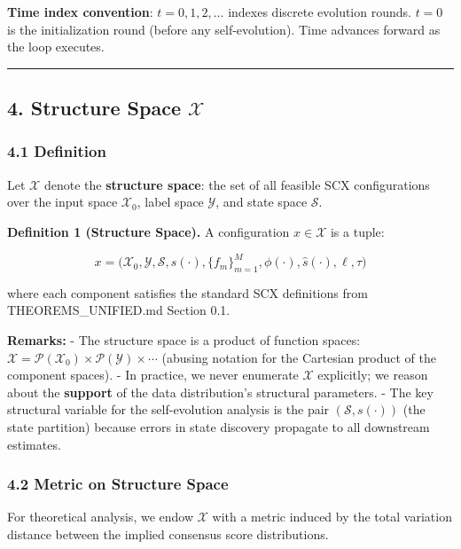 \documentclass[
  12pt,
]{article}
\begin{document}
\textbf{Time index convention}: \(t = 0, 1, 2, \dots\) indexes discrete
evolution rounds. \(t=0\) is the initialization round (before any
self-evolution). Time advances forward as the loop executes.

\begin{center}\rule{0.5\linewidth}{0.5pt}\end{center}

\subsection{\texorpdfstring{4. Structure Space
\(\mathcal{X}\)}{4. Structure Space \textbackslash mathcal\{X\}}}\label{structure-space-mathcalx}

\subsubsection{4.1 Definition}\label{definition}

Let \(\mathcal{X}\) denote the \textbf{structure space}: the set of all
feasible SCX configurations over the input space \(\mathcal{X}_0\),
label space \(\mathcal{Y}\), and state space \(\mathcal{S}\).

\textbf{Definition 1 (Structure Space).} A configuration
\(x \in \mathcal{X}\) is a tuple:

\[x = \bigl( \mathcal{X}_0, \mathcal{Y}, \mathcal{S}, s(\cdot), \{f_m\}_{m=1}^M, \phi(\cdot), \hat{s}(\cdot), \ell, \tau \bigr)\]

where each component satisfies the standard SCX definitions from
THEOREMS\_UNIFIED.md Section 0.1.

\textbf{Remarks:} - The structure space is a product of function spaces:
\(\mathcal{X} = \mathcal{P}(\mathcal{X}_0) \times \mathcal{P}(\mathcal{Y}) \times \cdots\)
(abusing notation for the Cartesian product of the component spaces). -
In practice, we never enumerate \(\mathcal{X}\) explicitly; we reason
about the \textbf{support} of the data distribution's structural
parameters. - The key structural variable for the self-evolution
analysis is the pair \((\mathcal{S}, s(\cdot))\) (the state partition)
because errors in state discovery propagate to all downstream estimates.

\subsubsection{4.2 Metric on Structure
Space}\label{metric-on-structure-space}

For theoretical analysis, we endow \(\mathcal{X}\) with a metric induced
by the total variation distance between the implied consensus score
distributions.
\end{document}
